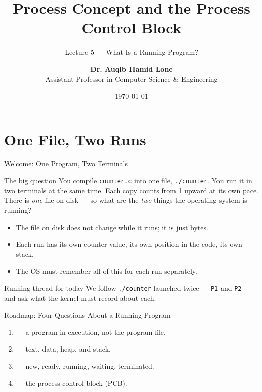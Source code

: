\documentclass[aspectratio=169]{beamer}
\title{Process Concept and the Process Control Block}
\subtitle{Lecture 5 --- What Is a Running Program?}
\author[Dr. Auqib Hamid Lone]{%
  \textbf{Dr. Auqib Hamid Lone}\\
  \small Assistant Professor in Computer Science \& Engineering
}
\institute[GCET Ganderbal]{%
  \small\textbf{PCC CS-502: Operating Systems}\\[0.3em]
  Department of Computer Science \& Engineering\\
  Government College of Engineering \& Technology (GCET), Ganderbal
}
\date[\today]{\small\today}
\begin{document}
\frame{\titlepage}

\section{One File, Two Runs}

\begin{frame}{Welcome: One Program, Two Terminals}
  \begin{block}{The big question}
    You compile \texttt{counter.c} into one file, \texttt{./counter}. You run
    it in two terminals at the same time. Each copy counts from 1 upward at its
    own pace. There is \emph{one} file on disk --- so what are the \emph{two}
    things the operating system is running?
  \end{block}
  \begin{itemize}
    \item The file on disk does not change while it runs; it is just bytes.
    \item Each run has its own counter value, its own position in the code,
      its own stack.
    \item The OS must remember all of this for each run separately.
  \end{itemize}
  \vspace{0.1cm}
  \begin{alertblock}{Running thread for today}
    We follow \texttt{./counter} launched twice --- \texttt{P1} and
    \texttt{P2} --- and ask what the kernel must record about each.
  \end{alertblock}
\end{frame}

\begin{frame}{Roadmap: Four Questions About a Running Program}
  \begin{enumerate}
    \item {} --- a program in execution, not the program
      file.
    \item {} --- text, data, heap,
      and stack.
    \item {} --- new, ready, running,
      waiting, terminated.
    \item {} --- the process control
      block (PCB).
  \end{enumerate}
  \vspace{0.2cm}
\end{frame}
\end{document}
